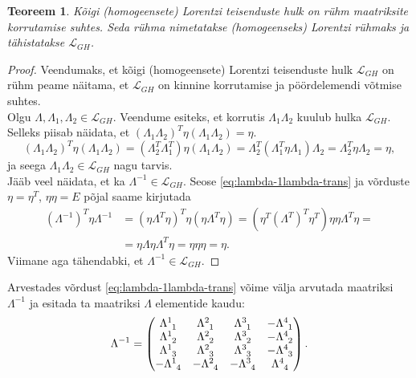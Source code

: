 \documentclass[a4paper,12pt]{article}
\theoremstyle{plain}
\newtheorem{teoreem}{Teoreem}[section]
\theoremstyle{definition}
\numberwithin{equation}{section}
\begin{document}
\begin{teoreem}
Kõigi (homogeensete) Lorentzi teisenduste hulk on rühm maatriksite korrutamise suhtes. Seda rühma nimetatakse \emph{(homogeenseks) Lorentzi rühmaks} ja tähistatakse $\mathcal{L}_{GH}$.
\end{teoreem}

\begin{proof}
Veendumaks, et kõigi (homogeensete) Lorentzi teisenduste hulk $\mathcal{L}_{GH}$ on rühm peame näitama, et $\mathcal{L}_{GH}$ on kinnine korrutamise ja pöörd\-elemendi võtmise suhtes.\\
Olgu $\Lambda, \Lambda_1, \Lambda_2 \in \mathcal{L}_{GH}$. Veendume esiteks, et korrutis $\Lambda_1 \Lambda_2$ kuulub hulka $\mathcal{L}_{GH}$. Selleks piisab näidata, et $\left(\Lambda_1 \Lambda_2\right)^T \eta \left(\Lambda_1 \Lambda_2\right) = \eta$.
\begin{equation*}
\left(\Lambda_1 \Lambda_2\right)^T \eta \left(\Lambda_1 \Lambda_2\right) = \left(\Lambda_2^T \Lambda_1^T\right) \eta \left(\Lambda_1 \Lambda_2\right) = \Lambda_2^T \left(\Lambda_1^T \eta \Lambda_1 \right) \Lambda_2 = \Lambda_2^T \eta \Lambda_2 = \eta,
\end{equation*}
ja seega $\Lambda_1 \Lambda_2 \in \mathcal{L}_{GH}$ nagu tarvis. \\
Jääb veel näidata, et ka $\Lambda^{-1 } \in \mathcal{L}_{GH}$. Seose \ref{eq:lambda-1lambda-trans} ja võrduste $\eta = \eta^T$, $\eta \eta = E$ põjal saame kirjutada
\begin{align*}
\left(\Lambda^{-1}\right)^T \eta \Lambda^{-1} &= \left(\eta \Lambda^T \eta \right)^T \eta \left(\eta \Lambda^T \eta\right) = \left(\eta^T \left(\Lambda^T\right)^T \eta^T \right) \eta \eta \Lambda^T \eta = \\
&= \eta \Lambda \eta \Lambda^T \eta = \eta \eta \eta = \eta.
\end{align*}
Viimane aga tähendabki, et $\Lambda^{-1} \in \mathcal{L}_{GH}$.
\end{proof}

Arvestades võrdust \ref{eq:lambda-1lambda-trans} võime välja arvutada maatriksi $\Lambda^{-1}$ ja esitada ta maatriksi $\Lambda$ elementide kaudu:
\[\Lambda^{-1} = \begin{pmatrix}
\Lambda\indices{^1_1} & \Lambda\indices{^2_1} & \Lambda\indices{^3_1} & -\Lambda\indices{^4_1} \\ 
\Lambda\indices{^1_2} & \Lambda\indices{^2_2} & \Lambda\indices{^3_2} & -\Lambda\indices{^4_2} \\  
\Lambda\indices{^1_3} & \Lambda\indices{^2_3} & \Lambda\indices{^3_3} & -\Lambda\indices{^4_3} \\ 
-\Lambda\indices{^1_4} & -\Lambda\indices{^2_4} & -\Lambda\indices{^3_4} & \Lambda\indices{^4_4} \\ 
\end{pmatrix}.\]
\end{document}

